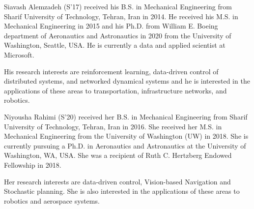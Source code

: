 \documentclass[journal]{IEEEtran}
\theoremstyle{definition}
\theoremstyle{remark}
\begin{document}
\begin{IEEEbiography}{Siavash Alemzadeh}
    (S'17) received his B.S. in Mechanical Engineering from Sharif University of Technology, Tehran, Iran in 2014. He received his M.S. in Mechanical Engineering in 2015 and his Ph.D. from William E. Boeing department of Aeronautics and Astronautics in 2020 from the University of Washington, Seattle, USA. He is currently a data and applied scientist at Microsoft.
    
    His research interests are reinforcement learning, data-driven control of distributed systems, and networked dynamical systems and he is interested in the applications of these areas to transportation, infrastructure networks, and robotics.
\end{IEEEbiography}
\begin{IEEEbiography}{Niyousha Rahimi} (S'20)
    received her B.S. in Mechanical Engineering from Sharif University of Technology, Tehran, Iran in 2016.
    She received her M.S. in Mechanical Engineering from the University of Washington (UW) in 2018.
    She is currently pursuing a Ph.D. in Aeronautics and Astronautics at the University of Washington, WA, USA. She was a recipient of 
    Ruth C. Hertzberg Endowed Fellowship in 2018.
    
    Her research interests are data-driven control, Vision-based Navigation and Stochastic planning. She is also interested in the applications of these areas to robotics and aerospace systems.
\end{IEEEbiography}
\end{document}
